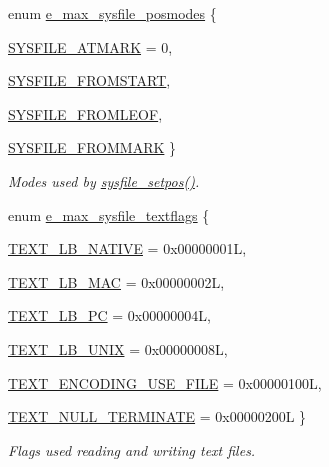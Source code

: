 \begin{DoxyCompactItemize}
enum \hyperlink{group__files_gaf61f48b912d9a2942d962ab5e61688fd}{e\_\-max\_\-sysfile\_\-posmodes} \{ \par
\hyperlink{group__files_ggaf61f48b912d9a2942d962ab5e61688fda912f3ce009e04501285d5e029edef84a}{SYSFILE\_\-ATMARK} =  0, 
\par
\hyperlink{group__files_ggaf61f48b912d9a2942d962ab5e61688fdaf0d10ac5a565be0a7af62c2ed4ca16ec}{SYSFILE\_\-FROMSTART}, 
\par
\hyperlink{group__files_ggaf61f48b912d9a2942d962ab5e61688fda25ca6f4d91093fcf6ae3646376c7433c}{SYSFILE\_\-FROMLEOF}, 
\par
\hyperlink{group__files_ggaf61f48b912d9a2942d962ab5e61688fda016f69a42070b5f2babbb1edd4fb27c0}{SYSFILE\_\-FROMMARK}
 \}
\begin{DoxyCompactList}\small\item\em Modes used by \hyperlink{group__files_gab832835d3d607efef4baeca7a059c6c0}{sysfile\_\-setpos()}. \item\end{DoxyCompactList}\item 
enum \hyperlink{group__files_ga77d70855c1424d078789b0abe6bc94cd}{e\_\-max\_\-sysfile\_\-textflags} \{ \par
\hyperlink{group__files_gga77d70855c1424d078789b0abe6bc94cda37e835ecc979f299ceb51fd54a7846ff}{TEXT\_\-LB\_\-NATIVE} =  0x00000001L, 
\par
\hyperlink{group__files_gga77d70855c1424d078789b0abe6bc94cda6b36993d91f168f154e0163f11f8cd18}{TEXT\_\-LB\_\-MAC} =  0x00000002L, 
\par
\hyperlink{group__files_gga77d70855c1424d078789b0abe6bc94cda1d0804396bf70029f4ad5be27da0fe59}{TEXT\_\-LB\_\-PC} =  0x00000004L, 
\par
\hyperlink{group__files_gga77d70855c1424d078789b0abe6bc94cda7832bdacfe3511733462b2550882c852}{TEXT\_\-LB\_\-UNIX} =  0x00000008L, 
\par
\hyperlink{group__files_gga77d70855c1424d078789b0abe6bc94cdae170ce3b6665f929791e1cfcc00d9eee}{TEXT\_\-ENCODING\_\-USE\_\-FILE} =  0x00000100L, 
\par
\hyperlink{group__files_gga77d70855c1424d078789b0abe6bc94cda134f84529c248946c91917a1e341a0db}{TEXT\_\-NULL\_\-TERMINATE} =  0x00000200L
 \}
\begin{DoxyCompactList}\small\item\em Flags used reading and writing text files. \item\end{DoxyCompactList}\end{DoxyCompactItemize}
